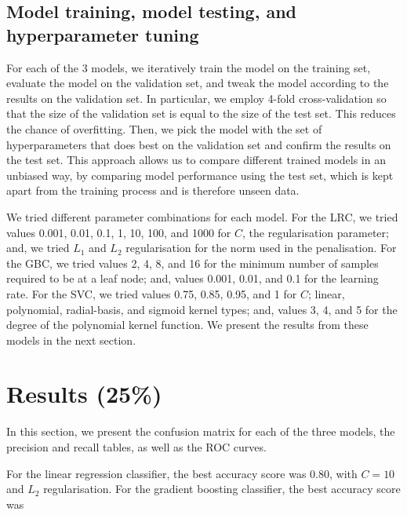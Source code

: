 \documentclass[twoside,11pt]{article}
\begin{document}
\subsection{Model training, model testing, and hyperparameter tuning}
For each of the 3 models, we iteratively train the model on the training set, evaluate the model on the validation set, and tweak the model according to the results on the validation set. In particular, we employ 4-fold cross-validation so that the size of the validation set is equal to the size of the test set. This reduces the chance of overfitting. Then, we pick the model with the set of hyperparameters that does best on the validation set and confirm the results on the test set. This approach allows us to compare different trained models in an unbiased way, by comparing model performance using the test set, which is kept apart from the training process and is therefore unseen data.

We tried different parameter combinations for each model. For the LRC, we tried values 0.001, 0.01, 0.1, 1, 10, 100, and 1000 for $C$, the regularisation parameter; and, we tried $L_1$ and $L_2$ regularisation for the norm used in the penalisation. For the GBC, we tried values 2, 4, 8, and 16 for the minimum number of samples required to be at a leaf node; and, values 0.001, 0.01, and 0.1 for the learning rate. For the SVC, we tried values 0.75, 0.85, 0.95, and 1 for $C$; linear, polynomial, radial-basis, and sigmoid kernel types; and, values 3, 4, and 5 for the degree of the polynomial kernel function. We present the results from these models in the next section.

\section{Results (25\%)}
In this section, we present the confusion matrix for each of the three models, the precision and recall tables, as well as  the ROC curves.

For the linear regression classifier, the best accuracy score was 0.80, with $C=10$ and $L_2$ regularisation. For the gradient boosting classifier, the best accuracy score was 
\end{document}
